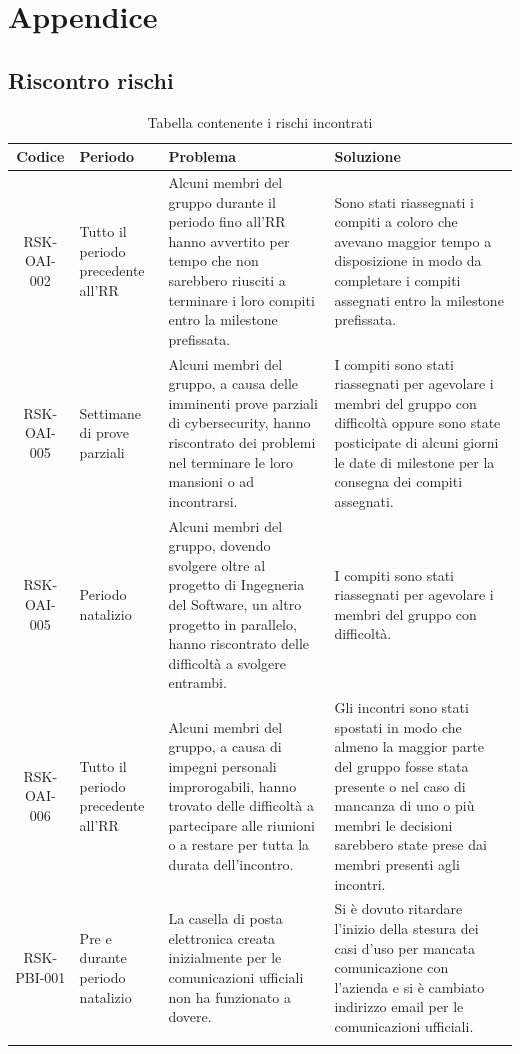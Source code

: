 \appendix
{}
\section{Appendice}

	\subsection{Riscontro rischi}

		\begin{center}
			\begin{longtable}{|c|p{3cm}|p{4cm}|p{4cm}|}
			\hline
			\rowcolor{lighter-grayer}
			\textbf{Codice} & \textbf{Periodo} & \textbf{Problema} & \textbf{Soluzione} \\
			\hline
			\endfirsthead

			\hline
			RSK-OAI-002 & Tutto il periodo precedente all'RR & Alcuni membri del gruppo durante il periodo fino all'RR hanno avvertito per tempo che non sarebbero riusciti a terminare i loro compiti entro la milestone prefissata. & Sono stati riassegnati i compiti a coloro che avevano maggior tempo a disposizione in modo da completare i compiti assegnati entro la milestone prefissata. \\
			\hline
			\hline
			RSK-OAI-005 & Settimane di prove parziali & Alcuni membri del gruppo, a causa delle imminenti prove parziali di cybersecurity, hanno riscontrato dei problemi nel terminare le loro mansioni o ad incontrarsi. & I compiti sono stati riassegnati per agevolare i membri del gruppo con difficoltà oppure sono state posticipate di alcuni giorni le date di milestone per la consegna dei compiti assegnati.  \\
			\hline
			\hline
			RSK-OAI-005 & Periodo natalizio & Alcuni membri del gruppo, dovendo svolgere oltre al progetto di Ingegneria del Software, un altro progetto in parallelo, hanno riscontrato delle difficoltà a svolgere entrambi. & I compiti sono stati riassegnati per agevolare i membri del gruppo con difficoltà.  \\
			\hline
			\hline
			RSK-OAI-006 & Tutto il periodo precedente all'RR & Alcuni membri del gruppo, a causa di impegni personali improrogabili, hanno trovato delle difficoltà a partecipare alle riunioni o a restare per tutta la durata dell'incontro. & Gli incontri sono stati spostati in modo che almeno la maggior parte del gruppo fosse stata presente o nel caso di mancanza di uno o più membri le decisioni sarebbero state prese dai membri presenti agli incontri. \\
			\hline
			\hline
			RSK-PBI-001 & Pre e durante periodo natalizio & La casella di posta elettronica creata inizialmente per le comunicazioni ufficiali non ha funzionato a dovere. & Si è dovuto ritardare l'inizio della stesura dei casi d'uso per mancata comunicazione con l'azienda e si è cambiato indirizzo email per le comunicazioni ufficiali. \\
			\hline
			\caption{Tabella contenente i rischi incontrati}
			\end{longtable}
		\end{center}

